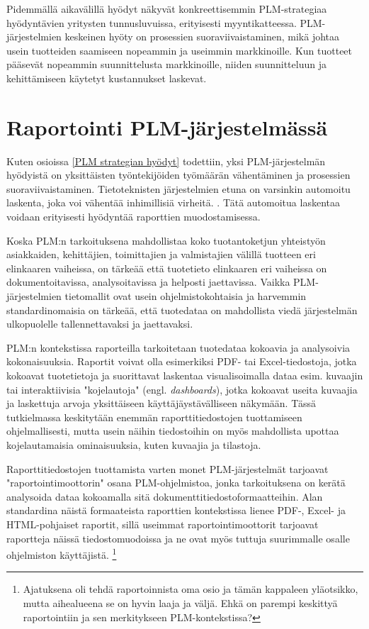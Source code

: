 Pidemmällä aikavälillä hyödyt näkyvät konkreettisemmin PLM-strategiaa hyödyntävien yritysten tunnusluvuissa, erityisesti myyntikatteessa. PLM-järjestelmien keskeinen hyöty on prosessien suoraviivaistaminen, mikä johtaa usein tuotteiden saamiseen nopeammin ja useimmin markkinoille. Kun tuotteet pääsevät nopeammin suunnittelusta markkinoille, niiden suunnitteluun ja kehittämiseen käytetyt kustannukset laskevat. \cite{bouhaddou_plm_2012} \cite{alemanni_key_2008}

\section{Raportointi PLM-järjestelmässä} \label{Raportointi PLM-järjestelmässä}

Kuten osioissa \ref{PLM strategian hyödyt} todettiin, yksi PLM-järjestelmän hyödyistä on yksittäisten työntekijöiden työmäärän vähentäminen ja prosessien suoraviivaistaminen. Tietoteknisten järjestelmien etuna on varsinkin automoitu laskenta, joka voi vähentää inhimillisiä virheitä. \cite{niu_organizational_2021}. \cite{rakovic_digital_2022} Tätä automoitua laskentaa voidaan erityisesti hyödyntää raporttien muodostamisessa.

Koska PLM:n tarkoituksena mahdollistaa koko tuotantoketjun yhteistyön asiakkaiden, kehittäjien, toimittajien ja valmistajien välillä tuotteen eri elinkaaren vaiheissa, \cite{bouhaddou_plm_2012} on tärkeää että tuotetieto elinkaaren eri vaiheissa on dokumentoitavissa, analysoitavissa ja helposti jaettavissa. Vaikka PLM-järjestelmien tietomallit ovat usein ohjelmistokohtaisia ja harvemmin standardinomaisia \cite{SritiMohamed-Foued2012PTaS} on tärkeää, että tuotedataa on mahdollista viedä järjestelmän ulkopuolelle tallennettavaksi ja jaettavaksi.

PLM:n kontekstissa raporteilla tarkoitetaan tuotedataa kokoavia ja analysoivia kokonaisuuksia. Raportit voivat olla esimerkiksi PDF- tai Excel-tiedostoja, jotka kokoavat tuotetietoja ja suorittavat laskentaa visualisoimalla dataa esim. kuvaajin tai interaktiivisia "kojelautoja" (engl. \textit{dashboards}), jotka kokoavat useita kuvaajia ja laskettuja arvoja yksittäiseen käyttäjäystävälliseen näkymään. Tässä tutkielmassa keskitytään enemmän raporttitiedostojen tuottamiseen ohjelmallisesti, mutta usein näihin tiedostoihin on myös mahdollista upottaa kojelautamaisia ominaisuuksia, kuten kuvaajia ja tilastoja.

Raporttitiedostojen tuottamista varten monet PLM-järjestelmät tarjoavat "raportointimoottorin" osana PLM-ohjelmistoa, jonka tarkoituksena on kerätä analysoida dataa kokoamalla sitä dokumenttitiedostoformaatteihin. Alan standardina näistä formaateista raporttien kontekstissa lienee PDF-, Excel- ja HTML-pohjaiset raportit, sillä useimmat raportointimoottorit tarjoavat raportteja näissä tiedostomuodoissa ja ne ovat myös tuttuja suurimmalle osalle ohjelmiston käyttäjistä. \footnote{Ajatuksena oli tehdä raportoinnista oma osio ja tämän kappaleen yläotsikko, mutta aihealueena se on hyvin laaja ja väljä. Ehkä on parempi keskittyä raportointiin ja sen 
merkitykseen PLM-kontekstissa?}

